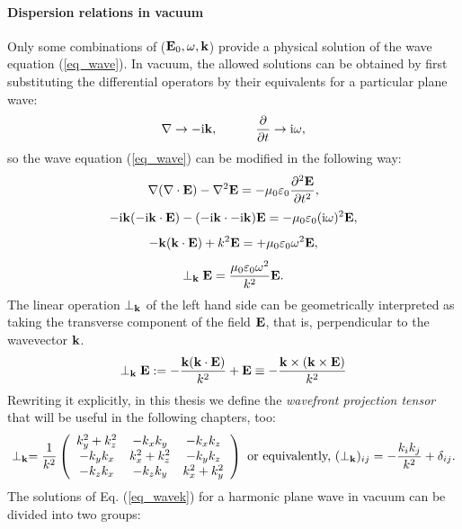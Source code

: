 \paragraph{Dispersion relations in vacuum} %
Only some combinations of ($\mathbf{E}_0, \omega, {\mathbf{k}}$) provide a physical solution of the wave equation (\ref{eq_wave}). In vacuum, the allowed solutions can be obtained by first substituting the differential operators by their equivalents for a particular plane wave:
\begin{equation} \nabla \rightarrow -{\mathrm i}{\mathbf{k}}, \quad\quad\quad 
\frac{\partial} {\partial t} \rightarrow {\mathrm i}\omega, \label{eq_difftok}\end{equation}
so the wave equation (\ref{eq_wave}) can be modified in the following way:
$$					\nabla (\nabla \cdot \mathbf{E}) - \nabla^2 \mathbf{E}				  =	-\mu_0 \varepsilon_0 \frac{\partial^{2} \mathbf{E}}{\partial t^{2}},  $$
$$				 -{\mathrm i}{\mathbf{k}} (-{\mathrm i}{\mathbf{k}} \cdot \mathbf{E})  - (-{\mathrm i}{\mathbf{k}} \cdot -{\mathrm i}{\mathbf{k}}) \mathbf{E} = -\mu_0 \varepsilon_0 ({\mathrm i}\omega)^2 \mathbf{E}, $$
$$   - {\mathbf{k}} ({\mathbf{k}} \cdot \mathbf{E})      +          k^2 \mathbf{E}            = +\mu_0 \varepsilon_0 \omega^{2} \mathbf{E},  $$
\begin{equation}  \perp_{\mathbf{k}}\mathbf{E}            = \frac{\mu_0 \varepsilon_0 \omega^{2}}{k^2} \mathbf{E}.  \label{eq_wavek}\end{equation}
The linear operation $\perp_{\mathbf{k}}$ of the left hand side can be geometrically interpreted as taking the transverse component of the field $\mathbf{E}$, that is, perpendicular to the wavevector ${\mathbf{k}}$. 
\begin{equation} \perp_{\mathbf{k}}\mathbf{E} :=  -\frac{{\mathbf{k}} ({\mathbf{k}} \cdot \mathbf{E})}{k^2} + \mathbf{E}     \equiv     - \frac{{\mathbf{k}}\times({\mathbf{k}}\times\mathbf{E})}{k^2} \label{eq_transverse1}\end{equation}
Rewriting it explicitly, in this thesis we define the \textit{wavefront projection tensor} that will be useful in the following chapters, too:
\begin{equation} \perp_{\mathbf{k}} = \frac{1}{k^2} 
\left(\begin{array}{ccc} 
	k_y^2+k_z^2  	& -k_x k_y 		& -k_x k_z \\ 
	-k_y k_x 		& k_x^2+k_z^2	& -k_y k_z \\ 
	-k_z k_x 		& -k_z k_y		& k_x^2+k_y^2
	\end{array} \right) 
\text{ or equivalently, }
(\perp_{\mathbf{k}})_{ij} = - \frac{k_i k_j}{k^2} + \delta_{ij} .  \label{eq_transverse2}\end{equation}
The solutions of Eq. (\ref{eq_wavek}) for a harmonic plane wave in vacuum can be divided into two groups: 

